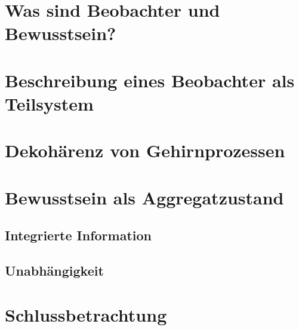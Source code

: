 
\newcommand{\Quote}[1]{\enquote{\emph{#1}}}

	
	\section{Was sind Beobachter und Bewusstsein?}
	
	\section{Beschreibung eines Beobachter als Teilsystem}
	
	\section{Dekohärenz von Gehirnprozessen}
	
	\section{Bewusstsein als Aggregatzustand}
	
		\subsection{Integrierte Information}
		
		\subsection{Unabhängigkeit}
		
	\section{Schlussbetrachtung}
	
	\newpage
	\nocite{Tegmark_15_short,Zeh_00}
	\printbibliography
